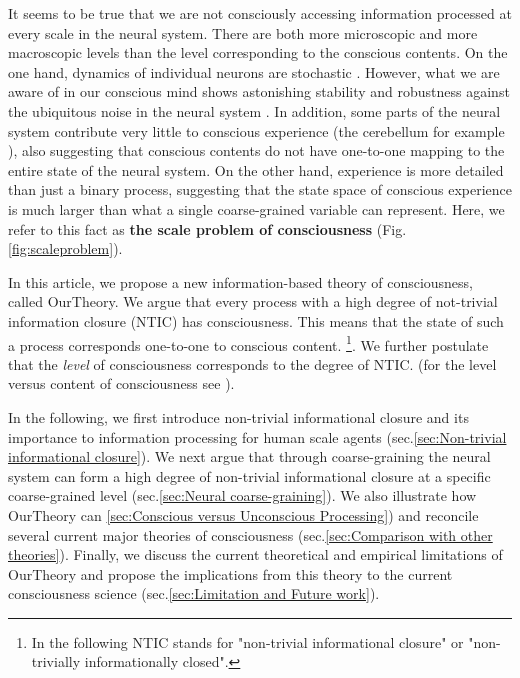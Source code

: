 \documentclass[utf8]{article}
\begin{document}
		It seems to be true that we are not consciously accessing information processed at every scale in the neural system. There are both more microscopic and more macroscopic levels than the level corresponding to the conscious contents. On the one hand, dynamics of individual neurons are stochastic \citep{Goldwyn2011, White2000}. However, what we are aware of in our conscious mind shows astonishing stability and robustness against the ubiquitous noise in the neural system \citep{mathis1995computational}. In addition, some parts of the neural system contribute very little to conscious experience (the cerebellum for example \citep{lemon2010life}), also suggesting that conscious contents do not have one-to-one mapping to the entire state of the neural system. On the other hand, experience is more detailed than just a binary process, suggesting that the state space of conscious experience is much larger than what a single coarse-grained variable can represent. Here, we refer to this fact as \textbf{the scale problem of consciousness} (Fig.\ref{fig:scaleproblem}).

		In this article, we propose a new information-based theory of consciousness, called \ac{OurTheory}. We argue that every process with a high degree of not-trivial information closure (NTIC) has consciousness. This means that the state of such a process corresponds one-to-one to conscious content. \footnote{In the following NTIC stands for "non-trivial informational closure" or "non-trivially informationally closed".}. We further postulate that the \textit{level} of consciousness corresponds to the degree of NTIC. (for the level versus content of consciousness see \cite{laureys2005neural, overgaard2010neural}).
		
		In the following, we first introduce non-trivial informational closure and its importance to information processing for human scale agents (sec.\ref{sec:Non-trivial informational closure}). We next argue that through coarse-graining the neural system can form a high degree of non-trivial informational closure at a specific coarse-grained level (sec.\ref{sec:Neural coarse-graining}). We also illustrate how \ac{OurTheory} can \ref{sec:Conscious versus Unconscious Processing}) and reconcile several current major theories of consciousness (sec.\ref{sec:Comparison with other theories}). Finally, we discuss the current theoretical and empirical limitations of \ac{OurTheory} and propose the implications from this theory to the current consciousness science (sec.\ref{sec:Limitation and Future work}). 
\end{document}
